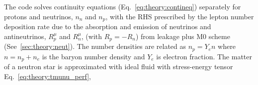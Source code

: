 %

The code solves continuity equations (Eq.~\eqref{eq:theory:contineq}) separately for 
protons and neutrinos, $n_n$ and $n_p$, with the \ac{RHS} prescribed by the 
lepton number deposition rate due to the absorption and emission of neutrinos 
and antineutrinos, $R_p^\mu$ and $R_n^\mu$, (with $R_p = -R_n$) 
from leakage plus M0 scheme (See~\ref{sec:theory:neut}).
%
%
%
%
%
%
The number densities are related as $n_p=Y_e n$ where $n = n_p + n_e$ is the baryon 
number density and $Y_e$ is electron fraction.
%
The matter of a neutron star is approximated with ideal fluid 
with stress-energy tensor Eq.~\eqref{eq:theory:tmunu_perf},
%


